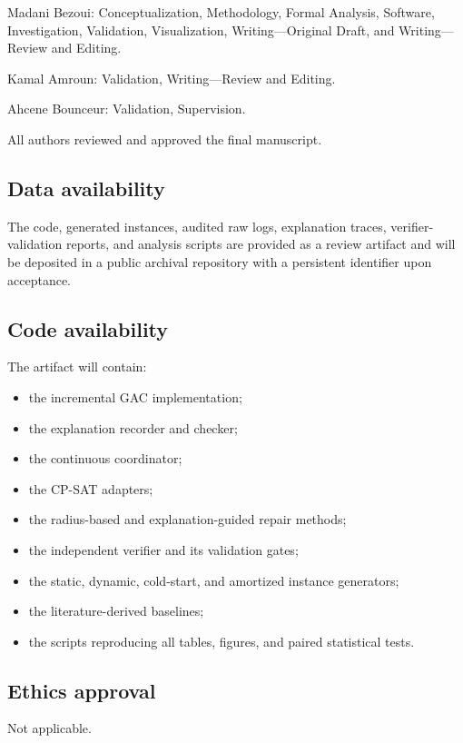 \documentclass[pdflatex,sn-mathphys-num,iicol,oneside]{sn-jnl}
\begin{document}
Madani Bezoui: Conceptualization, Methodology, Formal Analysis, Software, Investigation, Validation, Visualization, Writing---Original Draft, and Writing---Review and Editing.

Kamal Amroun: Validation, Writing---Review and Editing.

Ahcene Bounceur: Validation, Supervision.

All authors reviewed and approved the final manuscript.

\subsection*{Data availability}

The code, generated instances, audited raw logs, explanation traces,
verifier-validation reports, and analysis scripts are provided as a
review artifact and will be deposited in a public archival repository
with a persistent identifier upon acceptance.

\subsection*{Code availability}

The artifact will contain:

\begin{itemize}
    \item the incremental GAC implementation;
    \item the explanation recorder and checker;
    \item the continuous coordinator;
    \item the CP-SAT adapters;
    \item the radius-based and explanation-guided repair methods;
    \item the independent verifier and its validation gates;
    \item the static, dynamic, cold-start, and amortized instance
    generators;
    \item the literature-derived baselines;
    \item the scripts reproducing all tables, figures, and paired
    statistical tests.
\end{itemize}

\subsection*{Ethics approval}

Not applicable.
\end{document}

